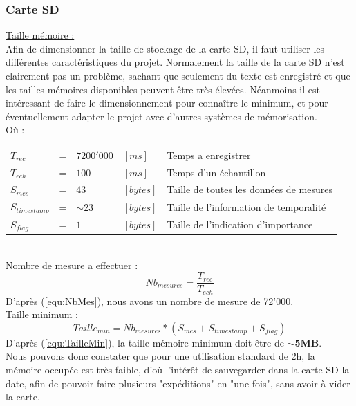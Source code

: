 {\subsubsection{Carte SD} \label{sssec:CarteSD}
{
    \underline{Taille mémoire :} \\
    Afin de dimensionner la taille de stockage de la carte SD, il faut utiliser les différentes caractéristiques du projet. Normalement la taille de la carte SD n'est clairement pas un problème, sachant que seulement du texte est enregistré et que les tailles mémoires disponibles peuvent être très élevées. Néanmoins il est intéressant de faire le dimensionnement pour connaître le minimum, et pour éventuellement adapter le projet avec d'autres systèmes de mémorisation.  \\
    Où : \vspace{+14pt} \\
    \begin{tabular}{l l ll|l}
       $ T_{rec} $ & = &  $7200'000$ & $[ms]$ & Temps a enregistrer \\
       $ T_{ech}$ & = & $100$  & $[ms]$ & Temps d'un échantillon \\
       $ S_{mes} $ & = & $43$ & $[bytes]$ & Taille de toutes les données de mesures  \\
       $ S_{timestamp} $ & = & $\sim$23 & $[bytes]$ & Taille de l'information de temporalité  \\
       $ S_{flag} $ & = & $ 1 $ & $[bytes]$ & Taille de l'indication d'importance 
    \end{tabular}
    \vspace{+14pt}
    \\
    Nombre de mesure a effectuer : \\ 
    \begin{equation} \label{equ:NbMes}
        Nb_{mesures} = \frac{T_{rec}}{T_{ech}}
    \end{equation} 
    D'après (\ref{equ:NbMes}), nous avons un nombre de mesure de 72'000.  \vspace{+8pt} \\
    
    Taille minimum : \\
    \begin{equation} \label{equ:TailleMin}
        Taille_{min} = Nb_{mesures} * (S_{mes}+S_{timestamp}+S_{flag}) 
    \end{equation}
    D'après (\ref{equ:TailleMin}), la taille mémoire minimum doit être de \textbf{$\sim$5MB}. \vspace{+8pt} \\ 
    Nous pouvons donc constater que pour une utilisation standard de 2h, la mémoire occupée est très faible, d'où l'intérêt de sauvegarder dans la carte SD la date, afin de pouvoir faire plusieurs "expéditions" en "une fois", sans avoir à vider la carte.
}


}
